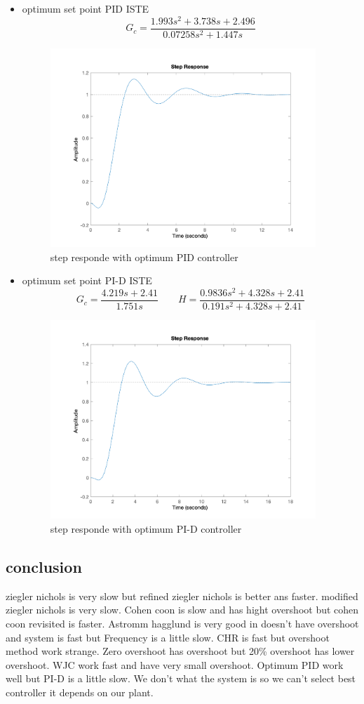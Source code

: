 \begin{itemize}
\begin{figure}[H]
    \end{figure}  
    \item optimum set point PID ISTE
    $$
    G_c =   \dfrac{1.993 s^2 + 3.738 s + 2.496}{0.07258 s^2 + 1.447 s}
    $$ 
    \begin{figure}[H]
        \caption{step responde with optimum PID controller}
        \centering
        \includegraphics[width=10cm]{../Figure/Q1/b/optpid.png}
    \end{figure}  
    \item optimum set point PI-D ISTE
    $$
    G_c =   \dfrac{4.219 s + 2.41}{1.751 s} \qquad H = \frac{0.9836 s^2 + 4.328 s + 2.41}{0.191 s^2 + 4.328 s + 2.41}
    $$ 
    \begin{figure}[H]
        \caption{step responde with optimum PI-D controller}
        \centering
        \includegraphics[width=10cm]{../Figure/Q1/b/optpi-d.png}
    \end{figure}  
\end{itemize}
\subsection{conclusion}
ziegler nichols is very slow but refined ziegler nichols is better ans faster. modified ziegler nichols is very slow.
Cohen coon is slow and has hight overshoot but cohen coon revisited is faster.
Astromm hagglund is very good in doesn't have overshoot and system is fast but Frequency is a little slow. CHR is fast but overshoot method work strange. Zero overshoot has overshoot but 20\% overshoot has lower overshoot.
WJC work fast and have very small overshoot.
Optimum PID work well but PI-D is a little slow.
We don't what the system is so we can't select best controller it depends on our plant.
